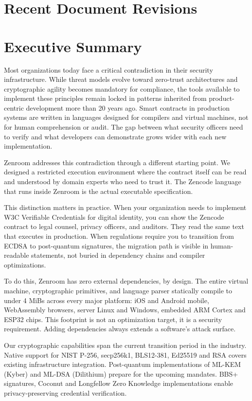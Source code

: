 \section{Recent Document Revisions}

\section{Executive Summary}

Most organizations today face a critical contradiction in their
security infrastructure. While threat models evolve toward zero-trust
architectures and cryptographic agility becomes mandatory for
compliance, the tools available to implement these principles remain
locked in patterns inherited from product-centric development more
than 20 years ago. Smart contracts in production systems are written
in languages designed for compilers and virtual machines, not for
human comprehension or audit. The gap between what security officers
need to verify and what developers can demonstrate grows wider with
each new implementation.

Zenroom addresses this contradiction through a different starting
point. We designed a restricted execution environment where the
contract itself can be read and understood by domain experts who need
to trust it. The Zencode language that runs inside Zenroom is the
actual executable specification.

This distinction matters in practice. When your organization needs to
implement W3C Verifiable Credentials for digital identity, you can
show the Zencode contract to legal counsel, privacy officers, and
auditors. They read the same text that executes in production. When
regulations require you to transition from ECDSA to post-quantum
signatures, the migration path is visible in human-readable
statements, not buried in dependency chains and compiler
optimizations.

To do this, Zenroom has zero external dependencies, by design. The
entire virtual machine, cryptographic primitives, and language parser
statically compile to under 4 MiBs across every major platform: iOS
and Android mobile, WebAssembly browsers, server Linux and Windows,
embedded ARM Cortex and ESP32 chips. This footprint is not an
optimization target, it is a security requirement. Adding dependencies
always extends a software's attack surface.

Our cryptographic capabilities span the current transition period in
the industry. Native support for NIST P-256, secp256k1, BLS12-381,
Ed25519 and RSA covers existing infrastructure
integration. Post-quantum implementations of ML-KEM (Kyber) and ML-DSA
(Dilithium) prepare for the upcoming mandates. BBS+ signatures,
Coconut and Longfellow Zero Knowledge implementations enable
privacy-preserving credential verification.

